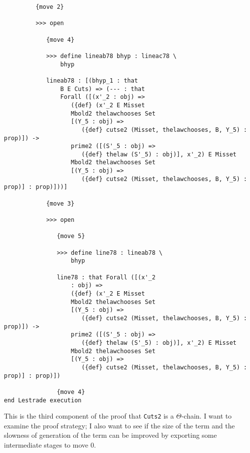\documentclass[12pt]{article}
\begin{document}
\begin{verbatim}
         {move 2}

         >>> open

            {move 4}

            >>> define lineab78 bhyp : lineac78 \
                bhyp

            lineab78 : [(bhyp_1 : that 
                B E Cuts) => (--- : that 
                Forall ([(x'_2 : obj) => 
                   ({def} (x'_2 E Misset 
                   Mbold2 thelawchooses Set 
                   [(Y_5 : obj) => 
                      ({def} cutse2 (Misset, thelawchooses, B, Y_5) : prop)]) -> 
                   prime2 ([(S'_5 : obj) => 
                      ({def} thelaw (S'_5) : obj)], x'_2) E Misset 
                   Mbold2 thelawchooses Set 
                   [(Y_5 : obj) => 
                      ({def} cutse2 (Misset, thelawchooses, B, Y_5) : prop)] : prop)]))]

            {move 3}

            >>> open

               {move 5}

               >>> define line78 : lineab78 \
                   bhyp

               line78 : that Forall ([(x'_2 
                   : obj) => 
                   ({def} (x'_2 E Misset 
                   Mbold2 thelawchooses Set 
                   [(Y_5 : obj) => 
                      ({def} cutse2 (Misset, thelawchooses, B, Y_5) : prop)]) -> 
                   prime2 ([(S'_5 : obj) => 
                      ({def} thelaw (S'_5) : obj)], x'_2) E Misset 
                   Mbold2 thelawchooses Set 
                   [(Y_5 : obj) => 
                      ({def} cutse2 (Misset, thelawchooses, B, Y_5) : prop)] : prop)])

               {move 4}
end Lestrade execution
\end{verbatim}

This is the third component of the proof that {\tt Cuts2} is a $\Theta$-chain.  I want to examine the proof strategy;  I also want to see if the size of the term and the slowness of generation of the term can be improved by exporting some intermediate stages to move 0.
\end{document}
